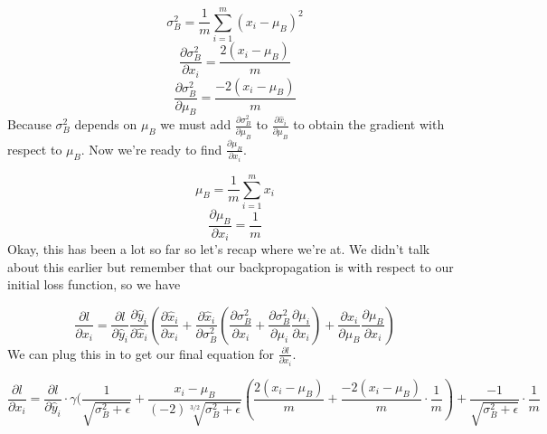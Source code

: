 \documentclass[12pt]{article}
\begin{document}
\begin{equation*}
    \sigma_B^2 = \frac{1}{m} \sum_{i=1}^m (x_i - \mu_B)^2
\end{equation*}
\begin{equation*}
    \frac{\partial \sigma_B^2}{\partial x_i} = 
    \frac{2(x_i - \mu_B)}{m}
\end{equation*}
\begin{equation*}
    \frac{\partial \sigma_B^2}{\partial \mu_B} = 
    \frac{-2(x_i - \mu_B)}{m}
\end{equation*}
Because $\sigma_B^2$ depends on $\mu_B$ we must add 
$\frac{\partial \sigma_B^2}{\partial \mu_B}$ to $\frac{\partial \hat{x}_i}{\partial \mu_B}$
to obtain the gradient with respect to $\mu_B$. Now we're ready to find 
$\frac{\partial \mu_B}{\partial x_i}$. 

\begin{equation*}
    \mu_B = \frac{1}{m} \sum_{i=1}^m x_i
\end{equation*}
\begin{equation*}
    \frac{\partial \mu_B}{\partial x_i} = 
    \frac{1}{m}
\end{equation*}
Okay, this has been a lot so far so let's recap where we're at. We didn't talk 
about this earlier but remember that our backpropagation is with respect to 
our initial loss function, so we have

\begin{equation*}
    \frac{\partial l}{\partial x_i} = 
    \frac{\partial l}{\partial \hat{y}_i} 
    \frac{\partial \hat{y}_i} {\partial \hat{x}_i} 
    (
        \frac{\partial \hat{x}_i}{\partial x_i} + 
        \frac{\partial \hat{x}_i}{\partial \sigma_B^2} 
        (
            \frac{\partial \sigma_B^2}{\partial x_i} + 
            \frac{\partial \sigma_B^2}{\partial \mu_i} 
            \frac{\partial \mu_i}{\partial x_i} 
        ) + 
        \frac{\partial \hat{x}_i}{\partial \mu_B}
        \frac{\partial \mu_B}{\partial x_i} 
    )
\end{equation*}
We can plug this in to get our final equation for $\frac{\partial l}{\partial x_i}$. 

\begin{equation*}
    \frac{\partial l}{\partial x_i} = \frac{\partial l}{\partial \hat{y}_i} 
    \cdot \gamma
    (
        \frac{1}{\sqrt{\sigma_B^2 + \epsilon}} +
        \frac{x_i - \mu_B}{(-2) \sqrt[3/2]{\sigma_B^2 + \epsilon}}
        (   
            \frac{2(x_i - \mu_B)}{m} +
            \frac{-2(x_i - \mu_B)}{m} 
            \cdot \frac{1}{m}
        ) + 
        \frac{-1}{\sqrt{\sigma_B^2 + \epsilon}}
        \cdot \frac{1}{m}
\end{equation*}
\end{document}
